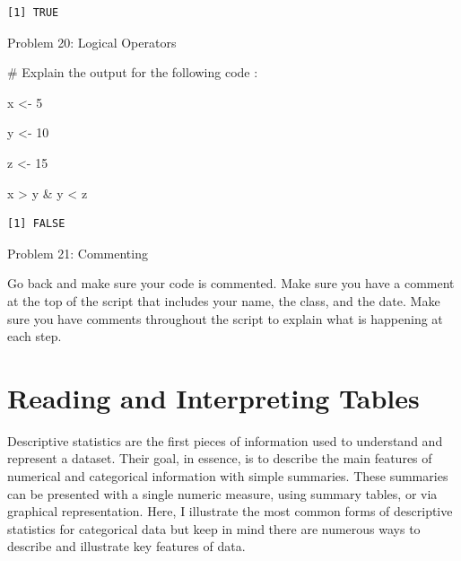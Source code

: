 \documentclass[
  letterpaper,
  DIV=11,
  numbers=noendperiod]{scrreprt}
\newenvironment{Shaded}{\begin{snugshade}}{\end{snugshade}}
\newcommand{\CommentTok}[1]{\textcolor[rgb]{0.37,0.37,0.37}{#1}}
\newcommand{\DecValTok}[1]{\textcolor[rgb]{0.68,0.00,0.00}{#1}}
\newcommand{\NormalTok}[1]{\textcolor[rgb]{0.00,0.23,0.31}{#1}}
\newcommand{\OtherTok}[1]{\textcolor[rgb]{0.00,0.23,0.31}{#1}}
\newcommand{\SpecialCharTok}[1]{\textcolor[rgb]{0.37,0.37,0.37}{#1}}
\begin{document}
\begin{verbatim}
[1] TRUE
\end{verbatim}

Problem 20: Logical Operators

\begin{Shaded}
\begin{Highlighting}[]
\CommentTok{\# Explain the output for the following code :}

\NormalTok{x }\OtherTok{\textless{}{-}} \DecValTok{5}

\NormalTok{y }\OtherTok{\textless{}{-}} \DecValTok{10}

\NormalTok{z }\OtherTok{\textless{}{-}} \DecValTok{15}

\NormalTok{x }\SpecialCharTok{\textgreater{}}\NormalTok{ y }\SpecialCharTok{\&}\NormalTok{ y }\SpecialCharTok{\textless{}}\NormalTok{ z}
\end{Highlighting}
\end{Shaded}

\begin{verbatim}
[1] FALSE
\end{verbatim}

Problem 21: Commenting

Go back and make sure your code is commented. Make sure you have a
comment at the top of the script that includes your name, the class, and
the date. Make sure you have comments throughout the script to explain
what is happening at each step.


\chapter*{Reading and Interpreting
Tables}\label{reading-and-interpreting-tables}


Descriptive statistics are the first pieces of information used to
understand and represent a dataset. Their goal, in essence, is to
describe the main features of numerical and categorical information with
simple summaries. These summaries can be presented with a single numeric
measure, using summary tables, or via graphical representation. Here, I
illustrate the most common forms of descriptive statistics for
categorical data but keep in mind there are numerous ways to describe
and illustrate key features of data.
\end{document}
